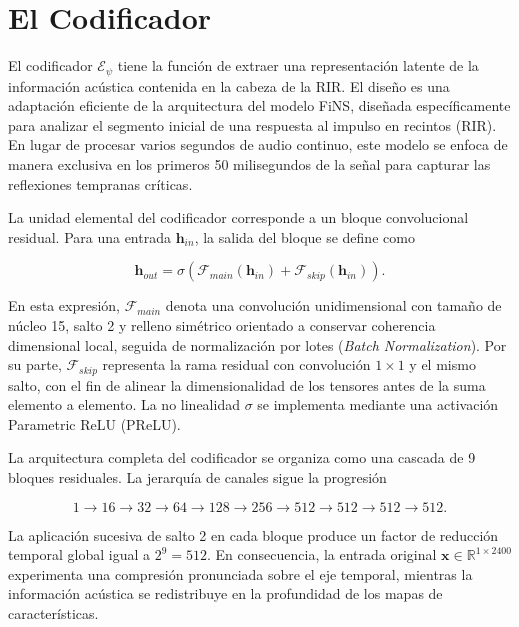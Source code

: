 \section{El Codificador}
El codificador $\mathcal{E}_{\psi}$ tiene la función de extraer una representación latente de la información acústica contenida en la cabeza de la RIR. El diseño es una adaptación eficiente de la arquitectura del modelo FiNS\cite{Steinmetz2021FiNS}, diseñada específicamente para analizar el segmento inicial de una respuesta al impulso en recintos (RIR). En lugar de procesar varios segundos de audio continuo, este modelo se enfoca de manera exclusiva en los primeros 50 milisegundos de la señal para capturar las reflexiones tempranas críticas. 

La unidad elemental del codificador corresponde a un bloque convolucional residual. Para una entrada $\mathbf{h}_{in}$, la salida del bloque se define como

\begin{equation}
\mathbf{h}_{out}=\sigma\left(\mathcal{F}_{main}(\mathbf{h}_{in})+\mathcal{F}_{skip}(\mathbf{h}_{in})\right).
\end{equation}

En esta expresión, $\mathcal{F}_{main}$ denota una convolución unidimensional con tamaño de núcleo 15, salto 2 y relleno simétrico orientado a conservar coherencia dimensional local, seguida de normalización por lotes (\textit{Batch Normalization}). Por su parte, $\mathcal{F}_{skip}$ representa la rama residual con convolución $1\times1$ y el mismo salto, con el fin de alinear la dimensionalidad de los tensores antes de la suma elemento a elemento. La no linealidad $\sigma$ se implementa mediante una activación Parametric ReLU (PReLU).

La arquitectura completa del codificador se organiza como una cascada de 9 bloques residuales. La jerarquía de canales sigue la progresión

\begin{equation}
1 \rightarrow 16 \rightarrow 32 \rightarrow 64 \rightarrow 128 \rightarrow 256 \rightarrow 512 \rightarrow 512 \rightarrow 512 \rightarrow 512.
\end{equation}

La aplicación sucesiva de salto 2 en cada bloque produce un factor de reducción temporal global igual a $2^9=512$. En consecuencia, la entrada original $\mathbf{x}\in\mathbb{R}^{1\times2400}$ experimenta una compresión pronunciada sobre el eje temporal, mientras la información acústica se redistribuye en la profundidad de los mapas de características.

